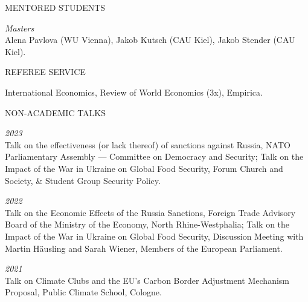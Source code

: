 \documentclass{article}
\begin{document}

\begin{minipage}[t]{0.12\textwidth}
    {\selectfont MENTORED STUDENTS} \\
\end{minipage}
\hspace{5mm}
\begin{minipage}[t]{0.8\textwidth}
    \textit{Masters} \\
    Alena Pavlova (WU Vienna), Jakob Kutsch (CAU Kiel), Jakob Stender (CAU Kiel).
\end{minipage}
\medskip


\begin{minipage}[t]{0.12\textwidth}
    {\selectfont REFEREE SERVICE} \\
\end{minipage}
\hspace{5mm}
\begin{minipage}[t]{0.8\textwidth}
    International Economics, Review of World Economics (3x), Empirica.
\end{minipage}
\medskip


\begin{minipage}[t]{0.12\textwidth}
    {\selectfont NON-ACADEMIC TALKS} \\
\end{minipage}
\hspace{5mm}
\begin{minipage}[t]{0.8\textwidth}
    \textit{2023} \\
    Talk on the effectiveness (or lack thereof) of sanctions against Russia, NATO Parliamentary Assembly --- Committee on Democracy and Security; Talk on the Impact of the War in Ukraine on Global Food Security, Forum Church and Society, \& Student Group Security Policy. \par 
    \textit{2022} \\
    Talk on the Economic Effects of the Russia Sanctions, Foreign Trade Advisory Board of the Ministry of the Economy, North Rhine-Westphalia; Talk on the Impact of the War in Ukraine on Global Food Security, Discussion Meeting with Martin Häusling and Sarah Wiener, Members of the European Parliament. \par
    \textit{2021} \\
    Talk on Climate Clubs and the EU's Carbon Border Adjustment Mechanism Proposal, Public Climate School, Cologne. \par
\end{minipage}
\medskip
\end{document}
